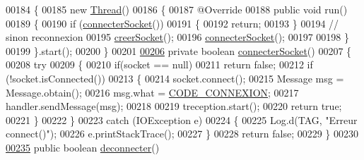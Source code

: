 \begin{DoxyCode}
00184     \{
00185         \textcolor{keyword}{new} \hyperlink{class_thread}{Thread}()
00186         \{
00187             @Override
00188             \textcolor{keyword}{public} \textcolor{keywordtype}{void} run()
00189             \{
00190                 \textcolor{keywordflow}{if} (\hyperlink{classcom_1_1lasalle_1_1io__trucks_1_1_peripherique_a982a4e5a8178b4e9f56e6611fad707ad}{connecterSocket}())
00191                 \{
00192                     \textcolor{keywordflow}{return};
00193                 \}
00194                 \textcolor{comment}{// sinon reconnexion}
00195                 \hyperlink{classcom_1_1lasalle_1_1io__trucks_1_1_peripherique_a2965bd91f73bf87536e1c743ddc2b76a}{creerSocket}();
00196                 \hyperlink{classcom_1_1lasalle_1_1io__trucks_1_1_peripherique_a982a4e5a8178b4e9f56e6611fad707ad}{connecterSocket}();
00197 
00198             \}
00199         \}.start();
00200     \}
00201 
\hyperlink{classcom_1_1lasalle_1_1io__trucks_1_1_peripherique_a982a4e5a8178b4e9f56e6611fad707ad}{00206}     \textcolor{keyword}{private} \textcolor{keywordtype}{boolean} \hyperlink{classcom_1_1lasalle_1_1io__trucks_1_1_peripherique_a982a4e5a8178b4e9f56e6611fad707ad}{connecterSocket}()
00207     \{
00208         \textcolor{keywordflow}{try}
00209         \{
00210             \textcolor{keywordflow}{if}(socket == null)
00211                 \textcolor{keywordflow}{return} \textcolor{keyword}{false};
00212             \textcolor{keywordflow}{if} (!socket.isConnected())
00213             \{
00214                 socket.connect();
00215                 Message msg = Message.obtain();
00216                 msg.what = \hyperlink{classcom_1_1lasalle_1_1io__trucks_1_1_peripherique_a46ce17bdb3396e4aee94ea06a0bd8556}{CODE\_CONNEXION};
00217                 handler.sendMessage(msg);
00218 
00219                 treception.start();
00220                 \textcolor{keywordflow}{return} \textcolor{keyword}{true};
00221             \}
00222         \}
00223         \textcolor{keywordflow}{catch} (IOException e)
00224         \{
00225             Log.d(TAG, \textcolor{stringliteral}{"Erreur connect()"});
00226             e.printStackTrace();
00227         \}
00228         \textcolor{keywordflow}{return} \textcolor{keyword}{false};
00229     \}
00230 
\hyperlink{classcom_1_1lasalle_1_1io__trucks_1_1_peripherique_afe5345d0dc31b1af1b311278241e228d}{00235}     \textcolor{keyword}{public} \textcolor{keywordtype}{boolean} \hyperlink{classcom_1_1lasalle_1_1io__trucks_1_1_peripherique_afe5345d0dc31b1af1b311278241e228d}{deconnecter}()

\end{DoxyCode}
